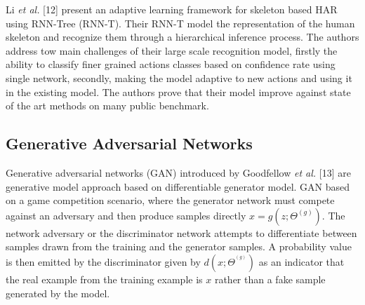 \hspace{5mm} Li \textit{et al.} [12] present an adaptive learning framework for skeleton based HAR using RNN-Tree (RNN-T). Their RNN-T model the representation of the human skeleton and recognize them through a hierarchical inference process. The authors address tow main challenges of their large scale recognition model, firstly the ability to classify finer grained actions classes based on confidence rate using single network, secondly, making the model adaptive to new actions and using it in the existing model. The authors prove that their model improve against state of the art methods on many public benchmark.

\subsection{Generative Adversarial Networks}
\hspace{5mm} Generative adversarial networks (GAN) introduced by Goodfellow \textit{et al.} [13] are generative model approach based on differentiable generator model. GAN based on a game competition scenario, where the generator network must compete against an adversary and then produce samples directly $x = g(z;\Theta ^{(g)})$. The network adversary or the discriminator network attempts to differentiate between samples drawn from the training and the generator samples. A probability value is then emitted by the discriminator given by $d(x;\Theta ^{^{(g)}})$ as an indicator that the real example from the training example is $x$ rather than a fake sample generated by the model.\\

